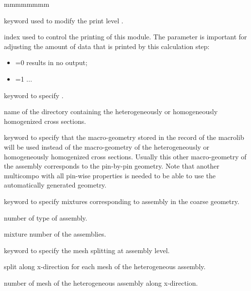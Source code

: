 \begin{ListeDeDescription}{mmmmmmmm}

\item[\moc{EDIT}] keyword used to modify the print level .

\item[\dusa{iprint}] index used to control the printing of this module. The
 parameter is important for adjusting the amount of data that is
printed by this calculation step:

\begin{itemize}

\item {}=0 results in no output;

\item {}=1 ...

\end{itemize}

\item[\moc{DIRGEO}] keyword to specify . 

\item[\dusa{namedir}] name of the directory containing the heterogeneously or homogeneously homogenized cross sections. 

\item[\moc{MACGEO}] keyword to specify that the macro-geometry stored in the  record of the macrolib will be used instead of the macro-geometry of the  heterogeneously or homogeneously homogenized cross sections. Usually this other macro-geometry of the assembly corresponds to the pin-by-pin geometry. Note that another multicompo with all pin-wise properties is needed to be able to use the automatically generated geometry. 

\item[\moc{MIXASS}] keyword to specify mixtures corresponding to assembly in the coarse geometry. 

\item[\dusa{nmix}] number of type of assembly. 

\item[\dusa{imix}] mixture number of the assemblies.

\item[\moc{SLPITX-ASS}] keyword to specify the mesh splitting at assembly level. 

\item[\dusa{ispx}] split along x-direction for each mesh of the heterogeneous assembly. 

\item[\dusa{nxass}] number of mesh of the heterogeneous assembly along x-direction. 


\end{ListeDeDescription}
